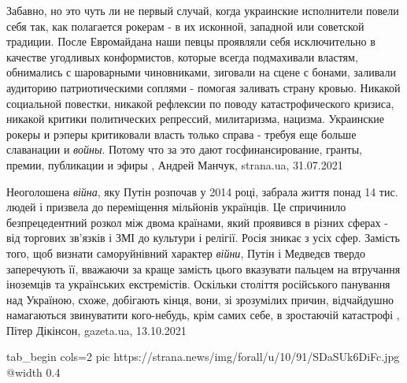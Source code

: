 Забавно, но это чуть ли не первый случай, когда украинские исполнители повели
себя так, как полагается рокерам - в их исконной, западной или советской
традиции. После Евромайдана наши певцы проявляли себя исключительно в качестве
угодливых конформистов, которые всегда подмахивали властям, обнимались с
шароварными чиновниками, зиговали на сцене с бонами, заливали аудиторию
патриотическими соплями - помогая заливать страну кровью.  Никакой социальной
повестки, никакой рефлексии по поводу катастрофического кризиса, никакой
критики политических репрессий, милитаризма, нацизма. Украинские рокеры и
рэперы критиковали власть только справа - требуя еще больше славанации и \emph{войны}.
Потому что за это дают госфинансирование, гранты, премии, публикации и эфиры
, Андрей Манчук, strana.ua, 31.07.2021

Неоголошена \emph{війна}, яку Путін розпочав у 2014 році, забрала життя понад 14 тис.
людей і призвела до переміщення мільйонів українців. Це спричинило
безпрецедентний розкол між двома країнами, який проявився в різних сферах - від
торгових зв'язків і ЗМІ до культури і релігії. Росія зникає з усіх сфер.
Замість того, щоб визнати саморуйнівний характер \emph{війни}, Путін і Медведєв твердо
заперечують її, вважаючи за краще замість цього вказувати пальцем на втручання
іноземців та українських екстремістів. Оскільки століття російського панування
над Україною, схоже, добігають кінця, вони, зі зрозумілих причин, відчайдушно
намагаються звинуватити кого-небудь, крім самих себе, в зростаючій катастрофі
, 
Пітер Дікінсон, gazeta.ua, 13.10.2021

\ifcmt
tab_begin cols=2
  pic https://strana.news/img/forall/u/10/91/SDaSUk6DiFc.jpg
  @width 0.4

